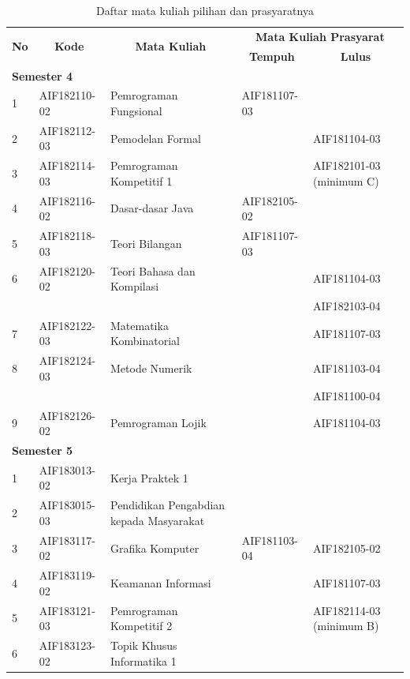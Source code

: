 \documentclass[a4paper,twoside]{article}
\begin{document}
\begin{enumerate}
\begin{enumerate}
\begin{table}[H]
	\centering
		\caption{Daftar mata kuliah pilihan dan prasyaratnya}
		\begin{tabular}{|p{0.5cm}|p{2.85cm}|p{4.95cm}|p{2.7cm}|p{2.7cm}|}
			\hline
			\multicolumn{1}{|c|}{\multirow{2}{*}{\textbf{No}}} & \multicolumn{1}{c|}{\multirow{2}{*}{\textbf{Kode}}} & \multicolumn{1}{c|}{\multirow{2}{*}{\textbf{Mata Kuliah}}} & \multicolumn{2}{c|}{\textbf{Mata Kuliah Prasyarat}} \\ \cline{4-5}
			 &  &  & \multicolumn{1}{c|}{\textbf{Tempuh}} & \multicolumn{1}{c|}{\textbf{Lulus}} \\ \hline
			\multicolumn{5}{|l|}{\textbf{Semester 4}} \\ \hline
1 & AIF182110-02 & Pemrograman Fungsional & AIF181107-03 &  \\ \hline
2 & AIF182112-03 & Pemodelan Formal &  & AIF181104-03 \\ \hline
3 & AIF182114-03 & Pemrograman Kompetitif 1 &  & AIF182101-03 (minimum C) \\ \hline
4 & AIF182116-02 & Dasar-dasar Java & AIF182105-02 &  \\ \hline
5 & AIF182118-03 & Teori Bilangan & AIF181107-03 &  \\ \hline
6 & AIF182120-02 & Teori Bahasa dan Kompilasi &  & AIF181104-03 \\
 &  &  &  & AIF182103-04 \\ \hline
7 & AIF182122-03 & Matematika Kombinatorial &  & AIF181107-03 \\ \hline
8 & AIF182124-03 & Metode Numerik &  & AIF181103-04 \\
 &  &  &  & AIF181100-04 \\ \hline
9 & AIF182126-02 & Pemrograman Lojik &  & AIF181104-03 \\ \hline
\multicolumn{5}{|l|}{\textbf{Semester 5}} \\ \hline
1 & AIF183013-02 & Kerja Praktek 1 &  &  \\ \hline
2 & AIF183015-03 & Pendidikan Pengabdian kepada Masyarakat &  &  \\ \hline
3 & AIF183117-02 & Grafika Komputer & AIF181103-04 & AIF182105-02 \\ \hline
4 & AIF183119-02 & Keamanan Informasi &  & AIF181107-03 \\ \hline
5 & AIF183121-03 & Pemrograman Kompetitif 2 &  & AIF182114-03 (minimum B) \\ \hline
6 & AIF183123-02 & Topik Khusus Informatika 1 &  &  \\ \hline

\end{tabular}
\end{table}
\end{enumerate}
\end{enumerate}
\end{document}
